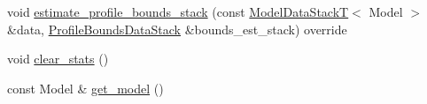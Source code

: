 \begin{DoxyCompactItemize}
\item 
void \hyperlink{classmappel_1_1estimator_1_1ThreadedEstimator_a3701a1dcbe15b6b8c35c15c929d7429a}{estimate\+\_\+profile\+\_\+bounds\+\_\+stack} (const \hyperlink{namespacemappel_aaeb6665bc57476dd93c2df6ad8bc4768}{Model\+Data\+StackT}$<$ Model $>$ \&data, \hyperlink{structmappel_1_1estimator_1_1ProfileBoundsDataStack}{Profile\+Bounds\+Data\+Stack} \&bounds\+\_\+est\+\_\+stack) override
\item 
void \hyperlink{classmappel_1_1estimator_1_1ThreadedEstimator_a63d49f8a3c965709ba45dc9e043651f1}{clear\+\_\+stats} ()
\item 
const Model \& \hyperlink{classmappel_1_1estimator_1_1Estimator_a076f485dfe0a925e01520c173f6fffe4}{get\+\_\+model} ()
\end{DoxyCompactItemize}
{\bf }\par
